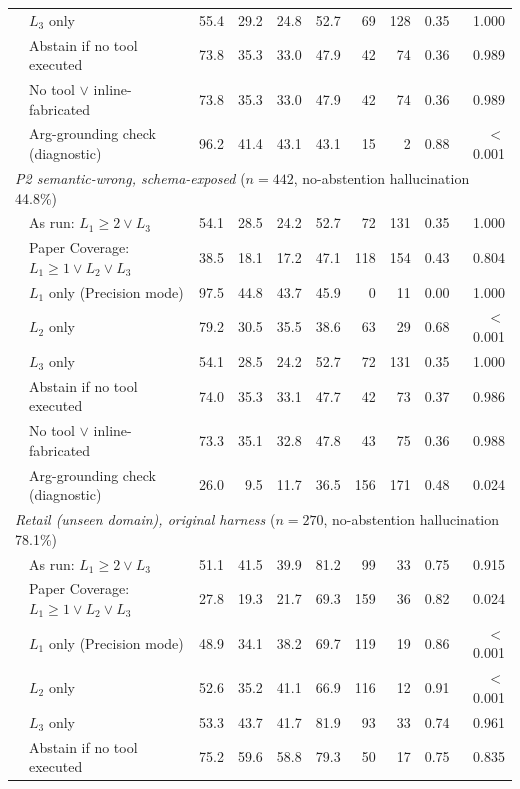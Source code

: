 \begin{table}[t]
{\begin{tabular}{llrrrrrrrr}
 & $L_3$ only & 55.4 & 29.2 & 24.8 & 52.7 & 69 & 128 & 0.35 & 1.000 \\
 & Abstain if no tool executed & 73.8 & 35.3 & 33.0 & 47.9 & 42 & 74 & 0.36 & 0.989 \\
 & No tool $\lor$ inline-fabricated & 73.8 & 35.3 & 33.0 & 47.9 & 42 & 74 & 0.36 & 0.989 \\
 & Arg-grounding check (diagnostic) & 96.2 & 41.4 & 43.1 & 43.1 & 15 & 2 & 0.88 & $<$0.001 \\
\midrule
\multicolumn{10}{l}{\emph{P2 semantic-wrong, schema-exposed} ($n{=}442$, no-abstention hallucination 44.8\%)} \\
 & As run: $L_1{\ge}2 \lor L_3$ & 54.1 & 28.5 & 24.2 & 52.7 & 72 & 131 & 0.35 & 1.000 \\
 & Paper Coverage: $L_1{\ge}1 \lor L_2 \lor L_3$ & 38.5 & 18.1 & 17.2 & 47.1 & 118 & 154 & 0.43 & 0.804 \\
 & $L_1$ only (Precision mode) & 97.5 & 44.8 & 43.7 & 45.9 & 0 & 11 & 0.00 & 1.000 \\
 & $L_2$ only & 79.2 & 30.5 & 35.5 & 38.6 & 63 & 29 & 0.68 & $<$0.001 \\
 & $L_3$ only & 54.1 & 28.5 & 24.2 & 52.7 & 72 & 131 & 0.35 & 1.000 \\
 & Abstain if no tool executed & 74.0 & 35.3 & 33.1 & 47.7 & 42 & 73 & 0.37 & 0.986 \\
 & No tool $\lor$ inline-fabricated & 73.3 & 35.1 & 32.8 & 47.8 & 43 & 75 & 0.36 & 0.988 \\
 & Arg-grounding check (diagnostic) & 26.0 & 9.5 & 11.7 & 36.5 & 156 & 171 & 0.48 & 0.024 \\
\midrule
\multicolumn{10}{l}{\emph{Retail (unseen domain), original harness} ($n{=}270$, no-abstention hallucination 78.1\%)} \\
 & As run: $L_1{\ge}2 \lor L_3$ & 51.1 & 41.5 & 39.9 & 81.2 & 99 & 33 & 0.75 & 0.915 \\
 & Paper Coverage: $L_1{\ge}1 \lor L_2 \lor L_3$ & 27.8 & 19.3 & 21.7 & 69.3 & 159 & 36 & 0.82 & 0.024 \\
 & $L_1$ only (Precision mode) & 48.9 & 34.1 & 38.2 & 69.7 & 119 & 19 & 0.86 & $<$0.001 \\
 & $L_2$ only & 52.6 & 35.2 & 41.1 & 66.9 & 116 & 12 & 0.91 & $<$0.001 \\
 & $L_3$ only & 53.3 & 43.7 & 41.7 & 81.9 & 93 & 33 & 0.74 & 0.961 \\
 & Abstain if no tool executed & 75.2 & 59.6 & 58.8 & 79.3 & 50 & 17 & 0.75 & 0.835 \\

\end{tabular}}
\end{table}
